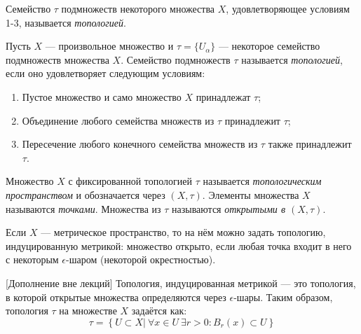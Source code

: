 
\begin{definition}
    Семейство $\tau$ подмножеств некоторого множества $X$, удовлетворяющее условиям 1-3, называется \textit{топологией}.
\end{definition}

\begin{definition}
    Пусть $X$ — произвольное множество и $\tau = \{U_{\alpha}\}$ — некоторое семейство подмножеств множества $X$. Семейство подмножеств $\tau$ называется \textit{топологией}, если оно удовлетворяет следующим условиям:
    \begin{enumerate}
        \item Пустое множество и само множество $X$ принадлежат $\tau$;
        \item Объединение любого семейства множеств из $\tau$ принадлежит $\tau$;
        \item Пересечение любого конечного семейства множеств из $\tau$ также принадлежит $\tau$.
    \end{enumerate}
\end{definition}

\begin{definition}
    Множество $X$ с фиксированной топологией $\tau$ называется \textit{топологическим пространством} и обозначается через $(X, \tau)$. Элементы множества $X$ называются \textit{точками}. Множества из $\tau$ называются \textit{открытыми в $(X, \tau)$}.
\end{definition}

Если $X$ — метрическое пространство, то на нём можно задать топологию, индуцированную метрикой: множество открыто, если любая точка входит в него с некоторым $\epsilon$-шаром (некоторой окрестностью).

[Дополнение вне лекций] Топология, индуцированная метрикой — это топология, в которой открытые множества определяются через $\epsilon$-шары. Таким образом, топология $\tau$ на множестве $X$ задаётся как:
\[\tau = \left\{U \subset X | \ \forall x \in U \ \exists r > 0: B_r(x) \subset U\right\}\]

